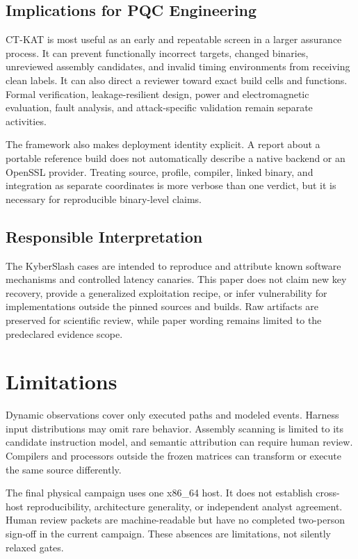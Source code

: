 \documentclass[cryptography,article,submit,moreauthors]{Definitions/mdpi}
\begin{document}
\subsection{Implications for PQC Engineering}

CT-KAT is most useful as an early and repeatable screen in a larger assurance
process. It can prevent functionally incorrect targets, changed binaries,
unreviewed assembly candidates, and invalid timing environments from receiving
clean labels. It can also direct a reviewer toward exact build cells and
functions. Formal verification, leakage-resilient design, power and
electromagnetic evaluation, fault analysis, and attack-specific validation
remain separate activities.

The framework also makes deployment identity explicit. A report about a
portable reference build does not automatically describe a native backend or
an OpenSSL provider. Treating source, profile, compiler, linked binary, and
integration as separate coordinates is more verbose than one verdict, but it
is necessary for reproducible binary-level claims.

\subsection{Responsible Interpretation}

The KyberSlash cases are intended to reproduce and attribute known software
mechanisms and controlled latency canaries. This paper does not claim new key
recovery, provide a generalized exploitation recipe, or infer vulnerability
for implementations outside the pinned sources and builds. Raw artifacts are
preserved for scientific review, while paper wording remains limited to the
predeclared evidence scope.

\section{Limitations}
\label{sec:limitations}

Dynamic observations cover only executed paths and modeled events. Harness
input distributions may omit rare behavior. Assembly scanning is limited to
its candidate instruction model, and semantic attribution can require human
review. Compilers and processors outside the frozen matrices can transform or
execute the same source differently.

The final physical campaign uses one x86\_64 host. It does not establish
cross-host reproducibility, architecture generality, or independent analyst
agreement. Human review packets are machine-readable but have no completed
two-person sign-off in the current campaign. These absences are limitations,
not silently relaxed gates.
\end{document}

